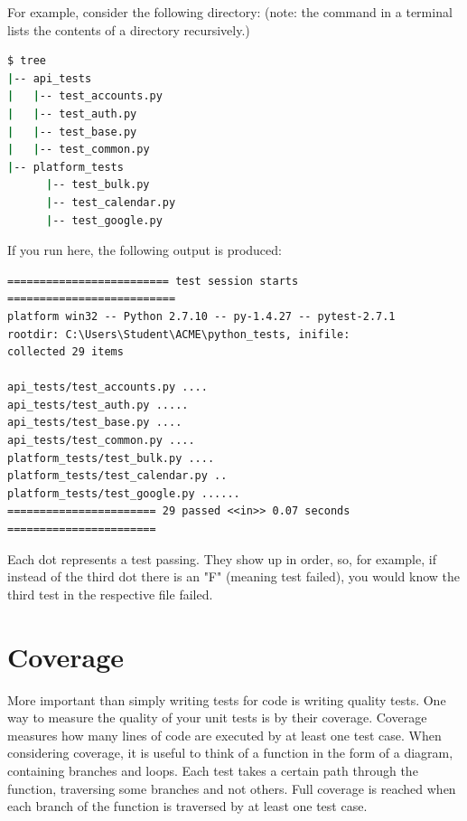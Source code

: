 For example, consider the following directory: (note: the  command in a terminal lists the contents of a directory recursively.)
\begin{lstlisting}[language=bash]
$ tree
|-- api_tests
|   |-- test_accounts.py
|   |-- test_auth.py
|   |-- test_base.py
|   |-- test_common.py
|-- platform_tests
      |-- test_bulk.py
      |-- test_calendar.py
      |-- test_google.py
\end{lstlisting}

If you run  here, the following output is produced:

\begin{lstlisting}
========================= test session starts ==========================
platform win32 -- Python 2.7.10 -- py-1.4.27 -- pytest-2.7.1
rootdir: C:\Users\Student\ACME\python_tests, inifile:
collected 29 items

api_tests/test_accounts.py ....
api_tests/test_auth.py .....
api_tests/test_base.py ....
api_tests/test_common.py ....
platform_tests/test_bulk.py ....
platform_tests/test_calendar.py ..
platform_tests/test_google.py ......
======================= 29 passed <<in>> 0.07 seconds =======================
\end{lstlisting}
\begin{info}
Each dot represents a test passing. They show up in order, so, for example, if instead of the third dot there is an "F" (meaning test failed), you would know the third test in the respective file failed.
\end{info}


\section*{Coverage}

More important than simply writing tests for code is writing quality tests. One way to measure the quality of your unit tests is by their coverage. Coverage measures how many lines of code are executed by at least one test case. 
When considering coverage, it is useful to think of a function in the form of a diagram, containing branches and loops. Each test takes a certain path through the function, traversing some branches and not others. Full coverage is reached when each branch of the function is traversed by at least one test case.

